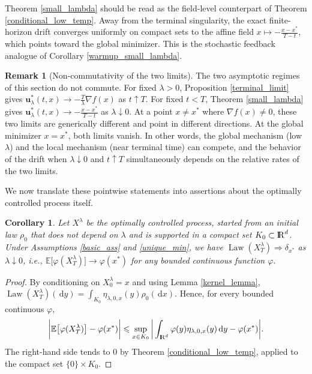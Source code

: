 \documentclass[11pt]{amsart}
\def\R{\mathrm{I\kern-0.21emR}}
\newcommand{\E}{\mathbb{E}}
\newcommand{\dd}{\,\mathrm{d}}
\newcommand{\Law}{\operatorname{Law}}
\renewcommand{\leq}{\leqslant}
\numberwithin{equation}{section}
\numberwithin{figure}{section}
\newtheorem{corollary}[theorem]{Corollary}%
\theoremstyle{definition}\newtheorem{remark}[theorem]{Remark}%
\begin{document}
Theorem \ref{small_lambda} should be read as the field-level counterpart of Theorem \ref{conditional_low_temp}. Away from the terminal singularity, the exact finite-horizon drift converges uniformly on compact sets to the affine field $\displaystyle x \mapsto - \frac{x - x^*}{T-t}$, which points toward the global minimizer. This is the stochastic feedback analogue of Corollary \ref{warmup_small_lambda}.

\begin{remark}[Non-commutativity of the two limits]\label{non_commute}
The two asymptotic regimes of this section do not commute. For fixed $\lambda > 0$, Proposition \ref{terminal_limit} gives $\mathbf u_\lambda^*(t,x) \to - \frac{T}{\lambda}\nabla f(x)$ as $t \uparrow T$. For fixed $t < T$, Theorem \ref{small_lambda} gives $\displaystyle \mathbf u_\lambda^*(t,x) \to - \frac{x - x^*}{T-t}$ as $\lambda \downarrow 0$. At a point $x \neq x^*$ where $\nabla f(x) \neq 0$, these two limits are generically different and point in different directions. At the global minimizer $x = x^*$, both limits vanish. In other words, the global mechanism (low $\lambda$) and the local mechanism (near terminal time) can compete, and the behavior of the drift when $\lambda \downarrow 0$ and $t \uparrow T$ simultaneously depends on the relative rates of the two limits.
\end{remark}

We now translate these pointwise statements into assertions about the optimally controlled process itself.

\begin{corollary}\label{terminal_process_concentration}
Let $X^\lambda$ be the optimally controlled process, started from an initial law $\rho_0$ that does not depend on $\lambda$ and is supported in a compact set $K_0 \subset \R^d$. Under Assumptions \ref{basic_ass} and \ref{unique_min}, we have $\Law(X_T^\lambda) \Rightarrow \delta_{x^*}$ as $\lambda \downarrow 0$, i.e., $\E \big[ \varphi(X_T^\lambda) \big] \to \varphi(x^*)$ for any bounded continuous function $\varphi$.
\end{corollary}

\begin{proof}
By conditioning on $X_0^\lambda = x$ and using Lemma \ref{kernel_lemma},
$\Law(X_T^\lambda)(\dd y) = \int_{K_0} \eta_{\lambda,0,x}(y)\rho_0(\dd x)$.
Hence, for every bounded continuous $\varphi$,
$$
\bigg\vert \E \big[ \varphi(X_T^\lambda) \big] - \varphi(x^*) \bigg\vert
\leq \sup_{x \in K_0} \bigg\vert \int_{\R^d} \varphi(y)\eta_{\lambda,0,x}(y)\dd y - \varphi(x^*) \bigg\vert.
$$
The right-hand side tends to $0$ by Theorem \ref{conditional_low_temp}, applied to the compact set $\{0\} \times K_0$.
\end{proof}
\end{document}
